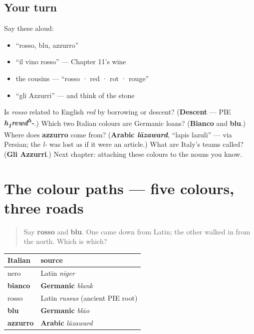 \subsection*{Your turn}
Say these aloud:

\begin{itemize}
\raggedright
  \item \textquotedblleft{}rosso, blu, azzurro\textquotedblright{}
  \item \textquotedblleft{}il vino rosso\textquotedblright{} — Chapter 11's wine
  \item the cousins — \textquotedblleft{}rosso · red · rot · rouge\textquotedblright{}
  \item \textquotedblleft{}gli Azzurri\textquotedblright{} — and think of the stone
\end{itemize}

\begin{tcolorbox}[breakable,colback=teal!4,colframe=teal!35!black,title={Before you move on}]
Is \emph{rosso} related to English \emph{red} by borrowing or descent? (\textbf{Descent} — PIE \emph{\textbf{h\textsubscript{1}rewd\textsuperscript{h}-}}.) Which two Italian colours are Germanic loans? (\textbf{Bianco} and \textbf{blu}.) Where does \textbf{azzurro} come from? (\textbf{Arabic \emph{lāzaward}}, \textquotedblleft{}lapis lazuli\textquotedblright{} — via Persian; the \emph{l-} was lost as if it were an article.) What are Italy's teams called? (\textbf{Gli Azzurri}.) Next chapter: attaching these colours to the nouns you know.
\end{tcolorbox}
\section[(the colour paths)]{The colour paths — five colours, three roads}

\label{lesson:IT-C13-colori-origini}



\begin{quote}
Say \textbf{rosso} and \textbf{blu}. One came down from Latin; the other walked in from the north. Which is which?
\end{quote}

\begin{grammarlens}[title={What you've built: the colour paths}]
\noindent
\begin{tabularx}{\linewidth}{@{}>{\raggedright\arraybackslash}X>{\raggedright\arraybackslash}X@{}}
\toprule
\textbf{Italian} & \textbf{source} \\
\midrule
nero & Latin \emph{niger} \\
\textbf{bianco} & \textbf{Germanic} \emph{blank} \\
rosso & Latin \emph{russus} (ancient PIE root) \\
\textbf{blu} & \textbf{Germanic} \emph{blāo} \\
\textbf{azzurro} & \textbf{Arabic} \emph{lāzaward} \\
\bottomrule
\end{tabularx}
\end{grammarlens}

